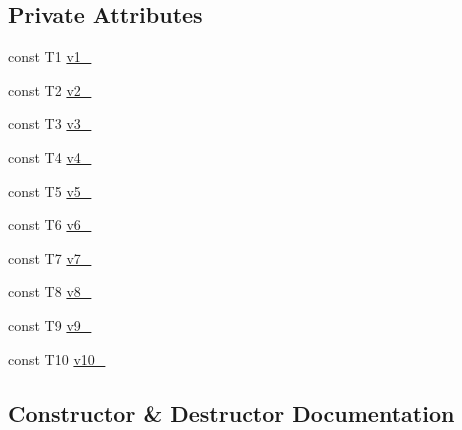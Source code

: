 \subsection*{Private Attributes}
\begin{DoxyCompactItemize}
\item 
const T1 \mbox{\hyperlink{classtesting_1_1internal_1_1_value_array10_a56c25f7677409a246f0f12833bc1274c}{v1\+\_\+}}
\item 
const T2 \mbox{\hyperlink{classtesting_1_1internal_1_1_value_array10_a86bfcdb6e7535ada7bc8c0b7a5d6c55d}{v2\+\_\+}}
\item 
const T3 \mbox{\hyperlink{classtesting_1_1internal_1_1_value_array10_aa0fab38b2fb8af588f6fc2e8a1e0637f}{v3\+\_\+}}
\item 
const T4 \mbox{\hyperlink{classtesting_1_1internal_1_1_value_array10_a8b39a45a432d351dde25b2fd18d8ce31}{v4\+\_\+}}
\item 
const T5 \mbox{\hyperlink{classtesting_1_1internal_1_1_value_array10_ad2fca1e2426304001039785d3b39659f}{v5\+\_\+}}
\item 
const T6 \mbox{\hyperlink{classtesting_1_1internal_1_1_value_array10_a75331d5c687f39796e0615c34e4097be}{v6\+\_\+}}
\item 
const T7 \mbox{\hyperlink{classtesting_1_1internal_1_1_value_array10_a63aaf573e558ade3c9030ba041f7590e}{v7\+\_\+}}
\item 
const T8 \mbox{\hyperlink{classtesting_1_1internal_1_1_value_array10_a70ba492f0d0f54d5dae53c05de44bcbe}{v8\+\_\+}}
\item 
const T9 \mbox{\hyperlink{classtesting_1_1internal_1_1_value_array10_afb3a5170d6ecc337f35a5fe53aa98001}{v9\+\_\+}}
\item 
const T10 \mbox{\hyperlink{classtesting_1_1internal_1_1_value_array10_a83c1930f33030c0ea300011ad036774a}{v10\+\_\+}}
\end{DoxyCompactItemize}


\subsection{Constructor \& Destructor Documentation}
\mbox{\label{classtesting_1_1internal_1_1_value_array10_a763527165bcd1d8e7c366f979b76736b}} 
